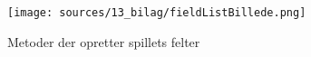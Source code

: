 \appendix

\begin{figure}[H]
    \centering
    \texttt{[image: sources/13\_bilag/fieldListBillede.png]}
    \caption{Metoder der opretter spillets felter}
    \label{fig:github}
\end{figure}
